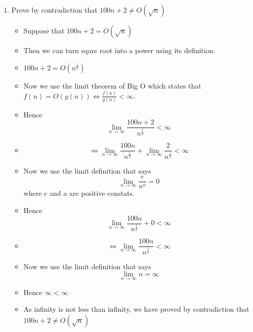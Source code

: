 \documentclass{article}
\begin{document}
\begin{enumerate}
\item Prove by contradiction that $100n+2\neq O(\sqrt{n})$
  \begin{itemize}
  \item Suppose that $100n+2 = O(\sqrt{n})$
  \item [] Then we can turn sqare root into a power using its definition.
  \item [] {\Large $100n+2 = O(n^{\frac{1}{2}})$}
    \item [] Now we use the limit theorem of Big O which states that $f(n)=O(g(n)) \Leftrightarrow \frac{f(n)}{g(n)} < \infty$.
  \item [] Hence {\Large $$\lim_{n \to \infty} \frac{100n+2}{n^{\frac{1}{2}}} < \infty$$}
  \item [] {\Large $$\Leftrightarrow \lim_{n \to \infty} \frac{100n}{n^{\frac{1}{2}}} + \lim_{n \to \infty} \frac{2}{n^{\frac{1}{2}}} < \infty$$}
  \item [] Now we use the limit definition that says {\Large $$\lim_{n \to \infty} \frac{c}{n^{a}} =0$$} where c and a are positive constats.
  \item [] Hence {\Large $$\lim_{n \to \infty} \frac{100n}{n^{\frac{1}{2}}} + 0 < \infty$$}
  \item [] {\Large $$\Leftrightarrow \lim_{n \to \infty} \frac{100n}{n^{\frac{1}{2}}} < \infty$$}
  \item [] Now we use the limit definition that says {\large $$\lim_{n \to \infty} n = \infty$$}
  \item [] Hence $\infty < \infty$
  \item As infinity is not less than infinity, we have proved by contradiction that $100n+2 \neq O(\sqrt{n})$
  \end{itemize}
\end{enumerate}
\end{document}
